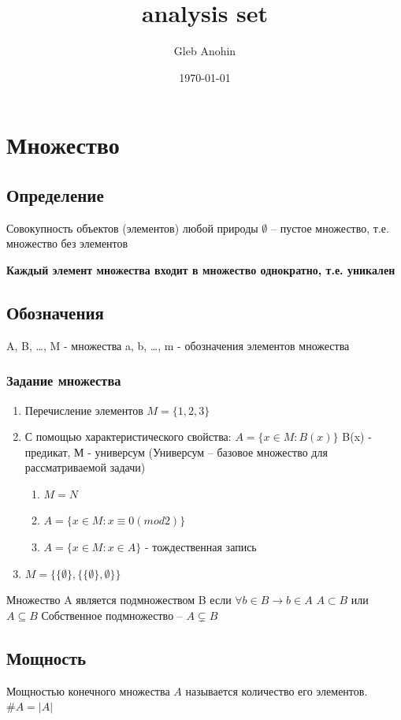 \documentclass[letterpaper]{article}
\author{Gleb Anohin}
\date{\today}
\title{analysis set}
\begin{document}
\maketitle
\tableofcontents

\section{Множество}
\label{sec:org2b45d61}
\subsection{Определение}
\label{sec:orgadc730e}
Совокупность объектов (элементов) любой природы
\(\emptyset\) -- пустое множество, т.е. множество без элементов

\textbf{Каждый элемент множества входит в множество однократно, т.е. уникален}
\subsection{Обозначения}
\label{sec:org81070d8}
A, B, \ldots{}, M - множества
a, b, \ldots{}, m - обозначения элементов множества
\subsubsection{Задание множества}
\label{sec:org4c91b36}
\begin{enumerate}
\item Перечисление элементов \(M = \{1, 2, 3\}\)
\item С помощью характеристического свойства: \(A = \{x \in M: B(x)\}\)
B(x) - предикат, М - универсум
(Универсум -- базовое множество для рассматриваемой задачи)
\begin{enumerate}
\item \(M = N\)
\item \(A = \{x \in M: x \equiv 0 (mod 2) \}\)
\item \(A = \{x \in M: x \in A\}\) - тождественная запись
\end{enumerate}
\item \(M = \{\{\emptyset\}, \{\{\emptyset\}, \emptyset\}\}\)
\end{enumerate}

Множество A является подмножеством B если \(\forall b \in B \rightarrow b \in A\)
\(A \subset B\) или \(A \subseteq B\)
Собственное подмножество -- \(A \subsetneq B\)
\subsection{Мощность}
\label{sec:org39784f9}
Мощностью конечного множества \(A\) называется количество его элементов.
\(\# A = |A|\)
\end{document}
